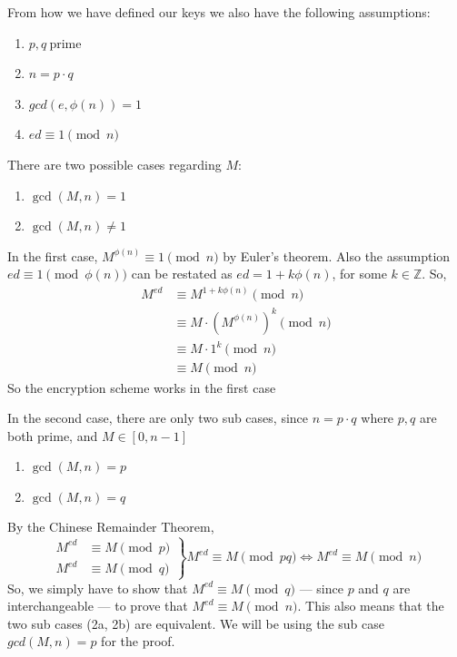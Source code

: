 \documentclass[12pt, titlepage]{article}
\begin{document}
        From how we have defined our keys we also have the following assumptions:
        \begin{enumerate}
            \item $p,q\ \text{prime}$
            \item $n = p \cdot q$
            \item $gcd(e, \phi(n)) = 1$ 
            \item $ed \equiv 1 \pmod{n}$
        \end{enumerate}

        There are two possible cases regarding $M$:
        \begin{enumerate}
            \item $\gcd(M, n) = 1$
            \item $\gcd(M, n) \not= 1$
        \end{enumerate}

        In the first case, $M^{\phi(n)} \equiv 1 \pmod{n}$ by Euler's theorem. Also the
        assumption $ed \equiv 1 \pmod{\phi(n)}$ can be restated as $ed = 1 + k\phi(n)$, for
        some $k \in \mathbb{Z}$. So, 
        \begin{align*}
            M^{ed} &\equiv M^{1 + k\phi(n)} \pmod{n} \\
                   &\equiv M \cdot (M^{\phi(n)})^k  \pmod{n} \\
                   &\equiv M \cdot 1^k \pmod{n} \\
                   &\equiv M \pmod{n}
        \end{align*}
        So the encryption scheme works in the first case

        In the second case, there are only two sub cases, since $n = p \cdot q$ where $p, q$
        are both prime, and $ M \in \left[0, n-1\right]$
        \renewcommand{\labelenumi}{2\alph{enumi}.}
        \begin{enumerate}
            \item $\gcd(M, n) = p$
            \item $\gcd(M, n) = q$
        \end{enumerate}
        
        By the Chinese Remainder Theorem,
        \begin{equation*}
            \left.
                \begin{aligned}
                    M^{ed} &\equiv M \pmod{p}\\
                    M^{ed} &\equiv M \pmod{q}
                \end{aligned}
            \right\}
            M^{ed} \equiv M \pmod{pq} \iff M^{ed} \equiv M \pmod{n}
        \end{equation*}
        So, we simply have to show that $M^{ed} \equiv M \pmod{q}$ --- since $p$ and $q$ are
        interchangeable --- to prove that $M^{ed} \equiv M \pmod{n}$. This also means that
        the two sub cases (2a, 2b) are equivalent. We will be using the sub case $gcd(M, n) =
        p$ for the proof.
        
\end{document}
